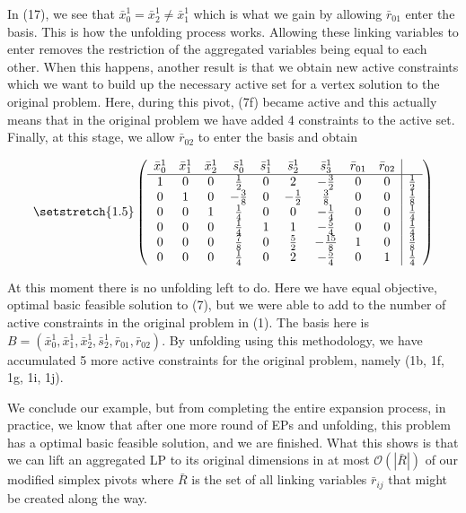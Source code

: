 \documentclass[11pt]{article} %
\begin{document}
	In (17), we see that $\bar{x}_0^1 = \bar{x}_2^1 \neq \bar{x}_1^1$ which is what we gain by allowing $\bar{r}_{01}$ enter the basis.  This is how the unfolding process works.  Allowing these linking variables to enter removes the restriction of the aggregated variables being equal to each other.  When this happens, another result is that we obtain new active constraints which we want to build up the necessary active set for a vertex solution to the original problem.  Here, during this pivot, (7f) became active and this actually means that in the original problem we have added 4 constraints to the active set.  Finally, at this stage, we allow $\bar{r}_{02}$ to enter the basis and obtain
	
	\begin{equation}\setstretch{1.5}
	\begin{pmatrix}
	\begin{array}{ccccccccc|c}
	\bar{x}^1_0 & \bar{x}^1_1 & \bar{x}^1_2 & \bar{s}^1_0 & \bar{s}^1_1 & \bar{s}^1_2 & \bar{s}^1_3 & \bar{r}_{01} & \bar{r}_{02} \\
	\hline
	1 & 0 & 0 & \frac{1}{2} & 0 & 2 & -\frac{3}{2} & 0 & 0 & \frac{1}{2} \\ 
	0 & 1 & 0 & -\frac{3}{8} & 0 & -\frac{1}{2} & \frac{3}{8} &  0 & 0 & \frac{1}{8} \\ 
	0 & 0 & 1 & \frac{1}{4} & 0 & 0 & -\frac{1}{4} & 0 & 0 & \frac{1}{4} \\ 
	0 & 0 & 0 & \frac{1}{4} & 1 & 1 & -\frac{5}{4} & 0 & 0 & \frac{1}{4} \\ 
	0 & 0 & 0 & \frac{7}{8} & 0 & \frac{5}{2} & -\frac{15}{8} & 1 & 0 & \frac{3}{8} \\
	0 & 0 & 0 & \frac{1}{4} & 0 & 2 & -\frac{5}{4} & 0 & 1 & \frac{1}{4} \\
	\end{array}
	\end{pmatrix}
	\end{equation}
	
	At this moment there is no unfolding left to do.  Here we have equal objective, optimal basic feasible solution to (7), but we were able to add to the number of active constraints in the original problem in (1).  The basis here is $B = (\bar{x}_0^1, \bar{x}_1^1, \bar{x}_2^1, \bar{s}_2^1, \bar{r}_{01}, \bar{r}_{02})$.  By unfolding using this methodology, we have accumulated 5 more active constraints for the original problem, namely (1b, 1f, 1g, 1i, 1j).
	
	We conclude our example, but from completing the entire expansion process, in practice, we know that after one more round of EPs and unfolding, this problem has a optimal basic feasible solution, and we are finished.  What this shows is that we can lift an aggregated LP to its original dimensions in at most $\mathcal{O}(|\bar{R}|)$ of our modified simplex pivots where $\bar{R}$ is the set of all linking variables $\bar{r}_{ij}$ that might be created along the way.
\end{document}
